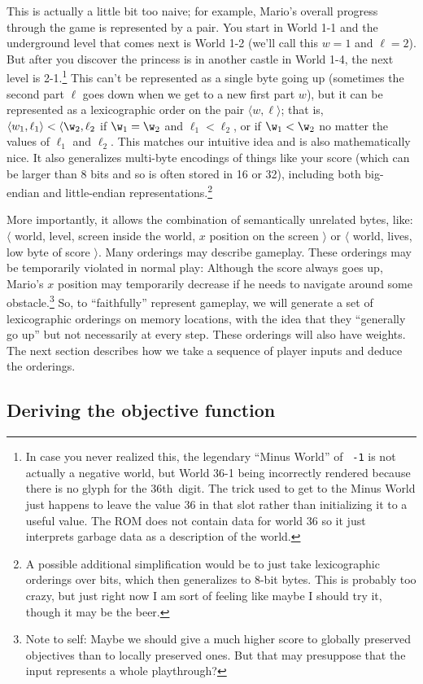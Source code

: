 \documentclass[twocolumn]{article}
\newcommand\th{th}
\begin{document}
This is actually a little bit too naive; for example, Mario's overall progress through the game is represented by a pair. You start in World 1-1 and the underground level that comes next is World 1-2 (we'll call this $w=1$ and $\ell=2$). But after you discover the princess is in another castle in World 1-4, the next level is 2-1.\footnote{In case you never realized this, the legendary ``Minus World'' of \verb+ -1+ is not actually a negative world, but World 36-1 being incorrectly rendered because there is no glyph for the 36\th\ digit. The trick used to get to the Minus World just happens to leave the value 36 in that slot rather than initializing it to a useful value. The ROM does not contain data for world 36 so it just interprets garbage data as a description of the world.} This can't be represented as a single byte going up (sometimes the second part $\ell$ goes down when we get to a new first part $w$), but it can be represented as a lexicographic order on the pair $\langle w, \ell \rangle$; that is, $\langle w_1, \ell_1 \rangle < \langle \w_2, \ell_2$ if $\w_1 = \w_2$ and $\ell_1 < \ell_2$, or if $\w_1 < \w_2$ no matter the values of $\ell_1$ and $\ell_2$. This matches our intuitive idea and is also mathematically nice. It also generalizes multi-byte encodings of things like your score (which can be larger than 8 bits and so is often stored in 16 or 32), including both big-endian and little-endian representations.\footnote{A possible additional simplification would be to just take lexicographic orderings over bits, which then generalizes to 8-bit bytes. This is probably too crazy, but just right now I am sort of feeling like maybe I should try it, though it may be the beer.}

More importantly, it allows the combination of semantically unrelated bytes, like: $\langle$ world, level, screen inside the world, $x$ position on the screen $\rangle$ or $\langle$ world, lives, low byte of score $\rangle$. Many orderings may describe gameplay. These orderings may be temporarily violated in normal play: Although the score always goes up, Mario's $x$ position may temporarily decrease if he needs to navigate around some obstacle.\footnote{Note to self: Maybe we should give a much higher score to globally preserved objectives than to locally preserved ones. But that may presuppose that the input represents a whole playthrough?} So, to ``faithfully'' represent gameplay, we will generate a set of lexicographic orderings on memory locations, with the idea that they ``generally go up'' but not necessarily at every step. These orderings will also have weights. The next section describes how we take a sequence of player inputs and deduce the orderings.

\subsection{Deriving the objective function}
\end{document}

